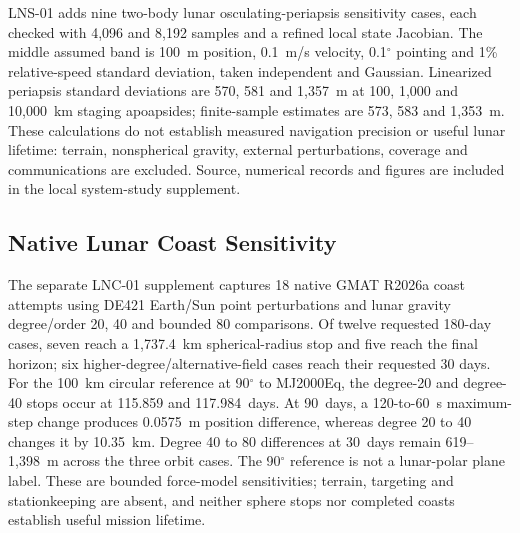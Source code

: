 \documentclass[conference]{IEEEtran}
\begin{document}
LNS-01 adds nine two-body lunar osculating-periapsis sensitivity cases, each checked with 4,096 and 8,192 samples and a refined local state Jacobian. The middle assumed band is 100~m position, 0.1~m/s velocity, 0.1$^\circ$ pointing and 1\% relative-speed standard deviation, taken independent and Gaussian. Linearized periapsis standard deviations are 570, 581 and 1,357~m at 100, 1,000 and 10,000~km staging apoapsides; finite-sample estimates are 573, 583 and 1,353~m. These calculations do not establish measured navigation precision or useful lunar lifetime: terrain, nonspherical gravity, external perturbations, coverage and communications are excluded. Source, numerical records and figures are included in the local system-study supplement.

\subsection{Native Lunar Coast Sensitivity}
The separate LNC-01 supplement captures 18 native GMAT R2026a coast attempts \cite{gmat} using DE421 Earth/Sun point perturbations and lunar gravity degree/order 20, 40 and bounded 80 comparisons. Of twelve requested 180-day cases, seven reach a 1,737.4~km spherical-radius stop and five reach the final horizon; six higher-degree/alternative-field cases reach their requested 30 days. For the 100~km circular reference at 90$^\circ$ to MJ2000Eq, the degree-20 and degree-40 stops occur at 115.859 and 117.984~days. At 90~days, a 120-to-60~s maximum-step change produces 0.0575~m position difference, whereas degree 20 to 40 changes it by 10.35~km. Degree 40 to 80 differences at 30~days remain 619--1,398~m across the three orbit cases. The 90$^\circ$ reference is not a lunar-polar plane label. These are bounded force-model sensitivities; terrain, targeting and stationkeeping are absent, and neither sphere stops nor completed coasts establish useful mission lifetime.
\end{document}
